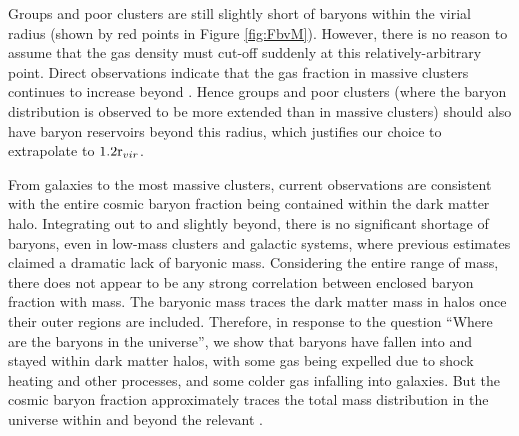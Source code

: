 

Groups and poor clusters are still slightly short of baryons within
the virial radius (shown by red points in Figure
\ref{fig:FbvM}). However, there is no reason to assume that the gas
density must cut-off suddenly at this relatively-arbitrary
point. Direct observations \citep{PlanckIntV} indicate that the gas
fraction in massive clusters continues to increase beyond
\rvir{}. Hence groups and poor clusters (where the baryon distribution
is observed to be more extended than in massive clusters) should
also have baryon reservoirs beyond this radius, which justifies
our choice to extrapolate \fg{} to $1.2\textrm{r\ensuremath{_{vir}}}$.

From galaxies to the most massive clusters, current observations are
consistent with the entire cosmic baryon fraction being contained
within the dark matter halo. Integrating out to \rvir{} and slightly
beyond, there is no significant shortage of baryons, even in low-mass
clusters and galactic systems, where previous estimates claimed a
dramatic lack of baryonic mass. Considering the entire range of mass,
there does not appear to be any strong correlation between enclosed
baryon fraction with mass. The baryonic mass traces the dark matter
mass in halos once their outer regions are included. Therefore, in
response to the question ``Where are the baryons in the universe'', we
show that baryons have fallen into and stayed within dark matter
halos, with some gas being expelled due to shock heating and other
processes, and some colder gas infalling into galaxies. But the cosmic
baryon fraction approximately traces the total mass distribution in
the universe within and beyond the relevant \rvir{}.

